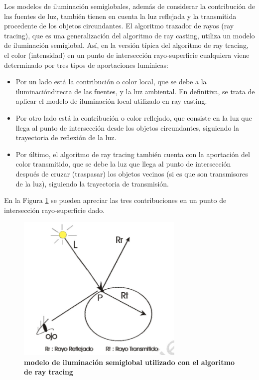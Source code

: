 Los modelos de iluminación semiglobales, además de considerar la contribución de las fuentes de luz, también tienen en cuenta la luz reflejada y la transmitida procedente de los objetos circundantes. El algoritmo trazador de rayos (ray tracing), que es una generalización del algoritmo de ray casting, utiliza un modelo de iluminación semiglobal.
Así, en la versión típica del algoritmo de ray tracing, el color (intensidad) en un punto de intersección rayo-superficie cualquiera viene determinado por tres tipos de aportaciones lumínicas:
\begin{itemize}
    \item Por un lado está la contribución o color local, que se debe a la iluminacióndirecta de las fuentes, y la luz ambiental. En definitiva, se trata de aplicar el modelo de iluminación local utilizado en ray casting.
    \item Por otro lado está la contribución o color reflejado, que consiste en la luz que llega al punto de intersección desde los objetos circundantes, siguiendo la trayectoria de reflexión de la luz.
    \item Por último, el algoritmo de ray tracing también cuenta con la aportación del color transmitido, que se debe la luz que llega al punto de intersección después de cruzar (traspasar) los objetos vecinos (si es que son transmisores de la luz), siguiendo la trayectoria de transmisión. 

\end{itemize}

En la Figura \ref{fig:grafica9} se pueden apreciar las tres contribuciones en un punto de intersección rayo-superficie dado.

\begin{figure}[h]
    \includegraphics[width=8cm]{Img/CPD/grafica9.jpg}
    \centering
    \caption{\textbf{\footnotesize{ modelo de iluminación semiglobal utilizado con el algoritmo de ray tracing  }}}
    \label{fig:grafica9}
\end{figure}


